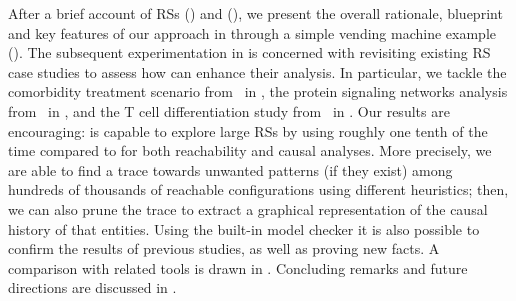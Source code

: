 After a brief account of RSs () and \GROOVE (), we present the overall rationale, blueprint and key features of our approach in  through a simple vending machine example ().
The subsequent experimentation in  is concerned with revisiting existing RS case studies to assess how \GROOVE can enhance their analysis. 
In particular, we tackle 
the comorbidity treatment scenario from~\cite{DBLP:conf/cmsb/BowlesBBFGM24} in , 
the protein signaling networks analysis from~\cite{DBLP:conf/cmsb/BallisBFO24} in , and
the T cell differentiation study from~\cite{datamod2023} in .
Our results are encouraging: \GROOVE is capable to explore large RSs 
by using roughly one tenth of the time compared to \BioResolve for both reachability and causal analyses.
More precisely, we are able to find a trace towards unwanted patterns (if they exist) among hundreds of thousands of reachable configurations using different heuristics; then, we can also prune the trace to extract a graphical representation of the causal history of that entities. Using the built-in model checker it is also possible to confirm the results of previous studies, as well as proving new facts.
A comparison with related tools is drawn in . Concluding remarks and future directions are discussed in .
